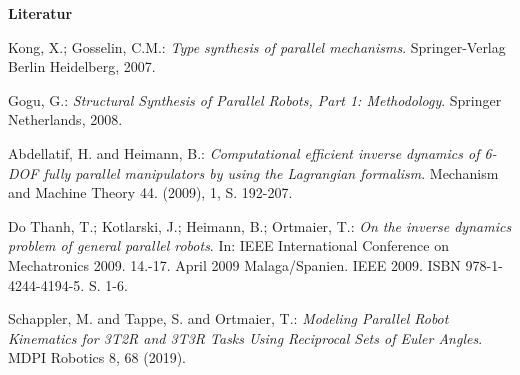 \documentclass[fleqn,a4paper,10pt]{article}
\begin{document}
\vspace{18pt} 

\begingroup\Large{\textbf{Literatur}}\endgroup
\begingroup %
\renewcommand{\section}[1]{} %
\begin{thebibliography}{99}
    
Kong, X.; Gosselin, C.M.:
\newblock \textit{Type synthesis of parallel mechanisms}.
\newblock Springer-Verlag Berlin Heidelberg, 2007.

Gogu, G.:
\newblock \textit{Structural Synthesis of Parallel Robots, Part 1: Methodology}.
\newblock Springer Netherlands, 2008.

Abdellatif, H. and Heimann, B.:
\newblock \textit{Computational efficient inverse dynamics of 6-DOF fully parallel manipulators by using the Lagrangian formalism}.
\newblock Mechanism and Machine Theory 44. (2009), 1, S. 192-207.


Do Thanh, T.; Kotlarski, J.; Heimann, B.; Ortmaier, T.:
\newblock \textit{On the inverse dynamics problem of general parallel robots}.
\newblock In: IEEE International Conference on Mechatronics 2009. 14.-17. April 2009 Malaga/Spanien. IEEE 2009. ISBN 978-1-4244-4194-5. S. 1-6. 

Schappler, M. and Tappe, S. and Ortmaier, T.:
\newblock \textit{Modeling Parallel Robot Kinematics for 3T2R and 3T3R Tasks Using Reciprocal Sets of Euler Angles}.
\newblock MDPI Robotics 8, 68 (2019).

\end{thebibliography}
\endgroup %

\clearpage  %
\end{document}
